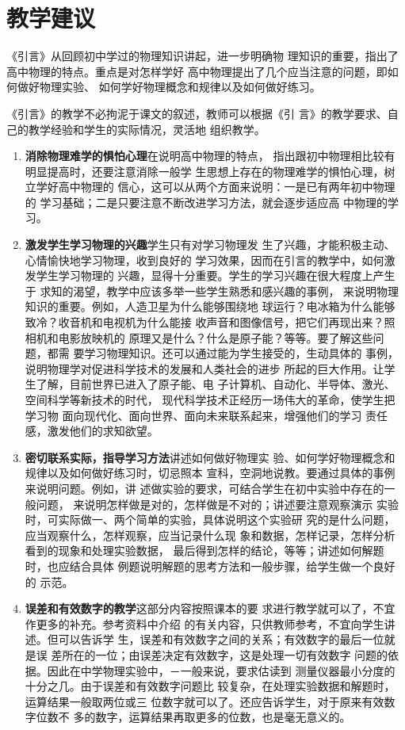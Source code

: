 \section{教学建议}
《引言》从回顾初中学过的物理知识讲起，进一步明确物
理知识的重要，指出了高中物理的特点。重点是对怎样学好
高中物理提出了几个应当注意的问题，即如何做好物理实验、
如何学好物理概念和规律以及如何做好练习。

《引言》的教学不必拘泥于课文的叙述，教师可以根据《引
言》的教学要求、自己的教学经验和学生的实际情况，灵活地
组织教学。

\begin{enumerate}
    \item \textbf{消除物理难学的惧怕心理}\quad  在说明高中物理的特点，
指出跟初中物理相比较有明显提高时，还要注意消除一般学
生思想上存在的物理难学的惧怕心理，树立学好高中物理的
信心，这可以从两个方面来说明：一是已有两年初中物理的
学习基础；二是只要注意不断改进学习方法，就会逐步适应高
中物理的学习。
\item \textbf{激发学生学习物理的兴趣}\quad  学生只有对学习物理发
生了兴趣，才能积极主动、心情愉快地学习物理，收到良好的
学习效果，因而在引言的教学中，如何激发学生学习物理的
兴趣，显得十分重要。学生的学习兴趣在很大程度上产生于
求知的渴望，教学中应该多举一些学生熟悉和感兴趣的事例，
来说明物理知识的重要。例如，人造卫星为什么能够围绕地
球运行？电冰箱为什么能够致冷？收音机和电视机为什么能接
收声音和图像信号，把它们再现出来？照相机和电影放映机的
原理又是什么？什么是原子能？等等。要了解这些问题，都需
要学习物理知识。还可以通过能为学生接受的，生动具体的
事例，说明物理学对促进科学技术的发展和人类社会的进步
所起的巨大作用。让学生了解，目前世界已进入了原子能、电
子计算机、自动化、半导体、激光、空间科学等新技术的时代，
现代科学技术正经历一场伟大的革命，使学生把学习物
面向现代化、面向世界、面向未来联系起来，增强他们的学习
责任感，激发他们的求知欲望。
\item \textbf{密切联系实际，指导学习方法}\quad  讲述如何做好物理实
验、如何学好物理概念和规律以及如何做好练习时，切忌照本
宣科，空洞地说教。要通过具体的事例来说明问题。例如，讲
述做实验的要求，可结合学生在初中实验中存在的一般问题，
来说明怎样做是对的，怎样做是不对的；讲述要注意观察演示
实验时，可实际做一、两个简单的实验，具体说明这个实验研
究的是什么问题，应当观察什么，怎样观察，应当记录什么现
象和数据，怎样记录，怎样分析看到的现象和处理实验数据，
最后得到怎样的结论，等等；讲述如何解题时，也应结合具体
例题说明解题的思考方法和一般步骤，给学生做一个良好的
示范。
\item \textbf{误差和有效数字的教学}\quad  这部分内容按照课本的要
求进行教学就可以了，不宜作更多的补充。参考资料中介绍
的有关内容，只供教师参考，不宜向学生讲述。但可以告诉学
生，误差和有效数字之间的关系；有效数字的最后一位就是误
差所在的一位；由误差决定有效数字，这是处理一切有效数字
问题的依据。因此在中学物理实验中，－一般来说，要求估读到
测量仪器最小分度的十分之几。由于误差和有效数字问题比
较复杂，在处理实验数据和解题时，运算结果一般取两位或三
位数字就可以了。还应告诉学生，对于原来有效数字位数不
多的数字，运算结果再取更多的位数，也是毫无意义的。
\end{enumerate}


